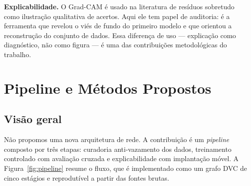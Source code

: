 \documentclass[11pt,a4paper]{article}
\begin{document}
	\textbf{Explicabilidade.} O Grad-CAM é usado na literatura de resíduos sobretudo como ilustração qualitativa de acertos. Aqui ele tem papel de auditoria: é a ferramenta que revelou o viés de fundo do primeiro modelo e que orientou a reconstrução do conjunto de dados. Essa diferença de uso --- explicação como diagnóstico, não como figura --- é uma das contribuições metodológicas do trabalho.
	
	\section{Pipeline e Métodos Propostos}
	\label{sec:pipeline}
	
	\subsection{Visão geral}
	
	Não propomos uma nova arquitetura de rede. A contribuição é um \textit{pipeline} composto por três etapas: curadoria anti-vazamento dos dados, treinamento controlado com avaliação cruzada e explicabilidade com implantação móvel. A Figura~\ref{fig:pipeline} resume o fluxo, que é implementado como um grafo DVC de cinco estágios e reprodutível a partir das fontes brutas.
	
\end{document}
